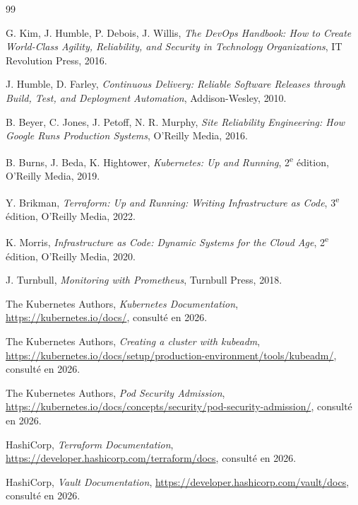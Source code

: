 \documentclass[12pt,a4paper,twoside,openright]{report}
\begin{document}
\begin{thebibliography}{99}

 G. Kim, J. Humble, P. Debois, J. Willis,
\emph{The DevOps Handbook: How to Create World-Class Agility, Reliability, and Security in Technology Organizations},
IT Revolution Press, 2016.

 J. Humble, D. Farley,
\emph{Continuous Delivery: Reliable Software Releases through Build, Test, and Deployment Automation},
Addison-Wesley, 2010.

 B. Beyer, C. Jones, J. Petoff, N. R. Murphy,
\emph{Site Reliability Engineering: How Google Runs Production Systems},
O'Reilly Media, 2016.

 B. Burns, J. Beda, K. Hightower,
\emph{Kubernetes: Up and Running}, 2\textsuperscript{e} édition, O'Reilly Media, 2019.

 Y. Brikman,
\emph{Terraform: Up and Running: Writing Infrastructure as Code}, 3\textsuperscript{e} édition,
O'Reilly Media, 2022.

 K. Morris,
\emph{Infrastructure as Code: Dynamic Systems for the Cloud Age}, 2\textsuperscript{e} édition,
O'Reilly Media, 2020.

 J. Turnbull,
\emph{Monitoring with Prometheus}, Turnbull Press, 2018.

 The Kubernetes Authors, \emph{Kubernetes Documentation},
\url{https://kubernetes.io/docs/}, consulté en 2026.

 The Kubernetes Authors,
\emph{Creating a cluster with kubeadm},
\url{https://kubernetes.io/docs/setup/production-environment/tools/kubeadm/}, consulté en 2026.

 The Kubernetes Authors, \emph{Pod Security Admission},
\url{https://kubernetes.io/docs/concepts/security/pod-security-admission/}, consulté en 2026.

 HashiCorp, \emph{Terraform Documentation},
\url{https://developer.hashicorp.com/terraform/docs}, consulté en 2026.

 HashiCorp, \emph{Vault Documentation},
\url{https://developer.hashicorp.com/vault/docs}, consulté en 2026.


\end{thebibliography}
\end{document}
